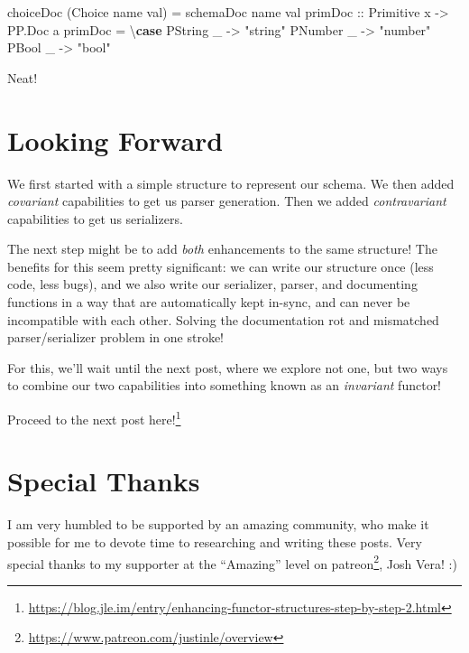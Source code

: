 \documentclass[]{article}
\newenvironment{Shaded}{}{}
\newcommand{\DataTypeTok}[1]{\textcolor[rgb]{0.56,0.13,0.00}{#1}}
\newcommand{\KeywordTok}[1]{\textcolor[rgb]{0.00,0.44,0.13}{\textbf{#1}}}
\newcommand{\NormalTok}[1]{#1}
\newcommand{\OtherTok}[1]{\textcolor[rgb]{0.00,0.44,0.13}{#1}}
\newcommand{\StringTok}[1]{\textcolor[rgb]{0.25,0.44,0.63}{#1}}
\renewcommand{\href}[2]{#2\footnote{\url{#1}}}
\begin{document}
\begin{Shaded}
\begin{Highlighting}[]
\NormalTok{    choiceDoc (}\DataTypeTok{Choice}\NormalTok{ name val) }\OtherTok{=}\NormalTok{ schemaDoc name val}
\OtherTok{    primDoc ::} \DataTypeTok{Primitive}\NormalTok{ x }\OtherTok{{-}\textgreater{}} \DataTypeTok{PP.Doc}\NormalTok{ a}
\NormalTok{    primDoc }\OtherTok{=}\NormalTok{ \textbackslash{}}\KeywordTok{case}
      \DataTypeTok{PString}\NormalTok{ \_ }\OtherTok{{-}\textgreater{}} \StringTok{"string"}
      \DataTypeTok{PNumber}\NormalTok{ \_ }\OtherTok{{-}\textgreater{}} \StringTok{"number"}
      \DataTypeTok{PBool}\NormalTok{   \_ }\OtherTok{{-}\textgreater{}} \StringTok{"bool"}
\end{Highlighting}
\end{Shaded}

Neat!

\section{Looking Forward}\label{looking-forward}

We first started with a simple structure to represent our schema. We then added
\emph{covariant} capabilities to get us parser generation. Then we added
\emph{contravariant} capabilities to get us serializers.

The next step might be to add \emph{both} enhancements to the same structure!
The benefits for this seem pretty significant: we can write our structure once
(less code, less bugs), and we also write our serializer, parser, and
documenting functions in a way that are automatically kept in-sync, and can
never be incompatible with each other. Solving the documentation rot and
mismatched parser/serializer problem in one stroke!

For this, we'll wait until the next post, where we explore not one, but two ways
to combine our two capabilities into something known as an \emph{invariant}
functor!

\href{https://blog.jle.im/entry/enhancing-functor-structures-step-by-step-2.html}{Proceed
to the next post here!}

\section{Special Thanks}\label{special-thanks}

I am very humbled to be supported by an amazing community, who make it possible
for me to devote time to researching and writing these posts. Very special
thanks to my supporter at the ``Amazing'' level on
\href{https://www.patreon.com/justinle/overview}{patreon}, Josh Vera! :)
\end{document}
